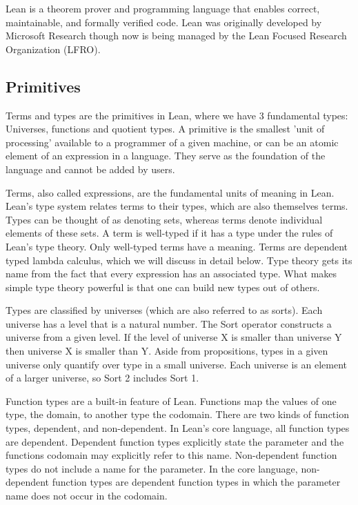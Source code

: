 \documentclass{article}
\newcommand{\1}{\mathbbm{1}}
\theoremstyle{plain}
\theoremstyle{definition}
\numberwithin{equation}{section}
\begin{document}
Lean is a theorem prover and programming language that enables correct, maintainable, and formally verified code. Lean was originally developed by Microsoft Research though now is being managed by the Lean Focused Research Organization (LFRO). 

\subsection{Primitives}

Terms and types are the primitives in Lean, where we have 3 fundamental types: Universes, functions and quotient types. A primitive is the smallest 'unit of processing' available to a programmer of a given machine, or can be an atomic element of an expression in a language. They serve as the foundation of the language and cannot be added by users. 

Terms, also called expressions, are the fundamental units of meaning in Lean.  Lean's type system relates terms to their types, which are also themselves terms. Types can be thought of as denoting sets, whereas terms denote individual elements of these sets. A term is well-typed if it has a type under the rules of Lean's type theory. Only well-typed terms have a meaning. Terms are dependent typed lambda calculus, which we will discuss  in detail below. Type theory gets its name from the fact that every expression has an associated type. What makes simple type theory powerful is that one can build new types out of others. 

Types are classified by universes (which are also referred to as sorts). Each universe has a level that is a natural number. The Sort operator constructs a universe from a given level. If the level of universe X is smaller than universe Y then universe X is smaller than Y.  Aside from propositions, types in a given universe only quantify over type in a small universe. Each universe is an element of a larger universe, so Sort 2 includes Sort 1. 

Function types are a built-in feature of Lean. Functions map the values of one type, the domain, to another type the codomain. There are two kinds of function types, dependent, and non-dependent. In Lean’s core language, all function types are dependent. Dependent function types explicitly state the parameter and the functions codomain may explicitly refer to this name. Non-dependent function types do not include a name for the parameter. In the core language, non-dependent function types are dependent function types in which the parameter name does not occur in the codomain.
\end{document}
